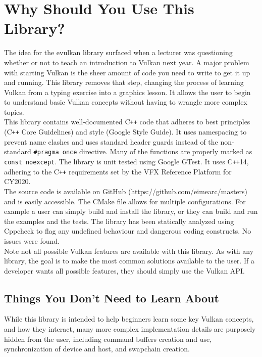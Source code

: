 \documentclass[12pt]{report}
\newcommand{\cpp}{C\texttt{++}}
\theoremstyle{definition}
\begin{document}
    \section{Why Should You Use This Library?}

      The idea for the evulkan library surfaced when a lecturer was questioning whether or not to teach
      an introduction to Vulkan next year. A major problem with starting Vulkan
      is the sheer amount of code you need to write to get it up and running.
      This library removes that step, changing the process of learning Vulkan
      from a typing exercise into a graphics lesson. It allows the user to
      begin to understand basic Vulkan concepts without having to wrangle more
      complex topics. \\

      This library contains well-documented \cpp{} code that adheres to best
      principles (\cpp{} Core Guidelines) and style (Google Style Guide). It
      uses namespacing to prevent name clashes and uses standard header guards
      instead of the non-standard \verb|#pragma once| directive. Many of the
      functions are properly marked as \verb!const noexcept!. The library is unit
      tested using Google GTest. It uses \cpp14, adhering to the \cpp{}
      requirements set by the VFX Reference Platform for CY2020. \\

      The source code is available on GitHub (https://github.com/eimearc/masters) and is easily accessible. The CMake
      file allows for multiple configurations. For example a user can simply
      build and install the library, or they can build and run the examples
      and the tests. The library has been statically analyzed using Cppcheck to
      flag any undefined behaviour and dangerous coding constructs. No issues
      were found. \\

      Note not all possible Vulkan features are available with this library.
      As with any library, the goal is to make the most common solutions
      available to the user. If a developer wants all possible features,
      they should simply use the Vulkan API.

      \subsection{Things You Don't Need to Learn About}

        While this library is intended to help beginners learn some key Vulkan
        concepts, and how they interact, many more complex implementation details
        are purposely hidden from the user, including command buffers creation and
        use, synchronization of device and host, and swapchain creation. \\
\end{document}
